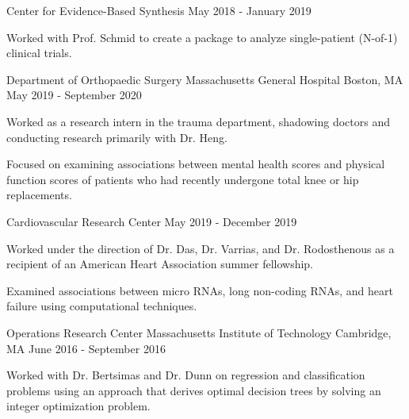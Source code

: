 \begin{cventries}
  \cventry
    {Center for Evidence-Based Synthesis} %
    {} %
    {} %
    {May 2018 - January 2019} %
    {
      \begin{cvitems} %
        \item {Worked with Prof. Schmid to create a package to analyze
        single-patient (N-of-1) clinical trials.}
      \end{cvitems}
    }

  \cventry
    {Department of Orthopaedic Surgery} %
    {Massachusetts General Hospital} %
    {Boston, MA} %
    {May 2019 - September 2020} %
    {
      \begin{cvitems} %
        \item {Worked as a research intern in the trauma department, shadowing 
        doctors and conducting research primarily with Dr. Heng.} 
        \item {Focused on examining associations between mental health scores
        and physical function scores of patients who had recently undergone 
        total knee or hip replacements.}
      \end{cvitems}
    }

  \cventry
    {Cardiovascular Research Center} %
    {} %
    {} %
    {May 2019 - December 2019} %
    {
      \begin{cvitems} %
        \item {Worked under the direction of Dr. Das, Dr. Varrias, and Dr. 
        Rodosthenous as a recipient of an American Heart Association summer 
        fellowship.} 
        \item {Examined associations between micro RNAs, long non-coding RNAs, 
        and heart failure using computational techniques.}
      \end{cvitems}
    }

  \cventry
    {Operations Research Center} %
    {Massachusetts Institute of Technology} %
    {Cambridge, MA} %
    {June 2016 - September 2016} %
    {
      \begin{cvitems} %
        \item {Worked with Dr. Bertsimas and Dr. Dunn on regression and
        classification problems using an approach that derives optimal decision
        trees by solving an integer optimization problem.}
      \end{cvitems}
    }


\end{cventries}
